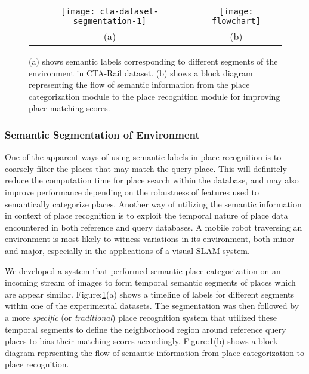 \documentclass{article}
\begin{document}
\begin{figure}
\centering
\begin{tabular}{cc}
	\hspace{-1cm}
	\texttt{[image: cta-dataset-segmentation-1]}&
	
	\texttt{[image: flowchart]}\\
	(a) & (b) \\
\end{tabular}
	\caption{ (a) shows semantic labels corresponding to different segments of the environment in CTA-Rail dataset. (b) shows a block diagram representing the flow of semantic information from the place categorization module to the place recognition module for improving place matching scores.}
	\label{fig:flowchart}
\end{figure}

\subsubsection{Semantic Segmentation of Environment}
One of the apparent ways of using semantic labels in place recognition is to coarsely filter the places that may match the query place. This will definitely reduce the computation time for place search within the database, and may also improve performance depending on the robustness of features used to semantically categorize places. Another way of utilizing the semantic information in context of place recognition is to exploit the temporal nature of place data encountered in both reference and query databases. A mobile robot traversing an environment is most likely to witness variations in its environment, both minor and major, especially in the applications of a visual SLAM system. 

We developed a system that performed semantic place categorization on an incoming stream of images to form temporal semantic segments of places which are appear similar. Figure:\ref{fig:flowchart}(a) shows a timeline of labels for different segments within one of the experimental datasets. The segmentation was then followed by a more \emph{specific} (or \emph{traditional}) place recognition system that utilized these temporal segments to define the neighborhood region around reference query places to bias their matching scores accordingly. Figure:\ref{fig:flowchart}(b) shows a block diagram reprsenting the flow of semantic information from place categorization to place recognition. 
\end{document}
